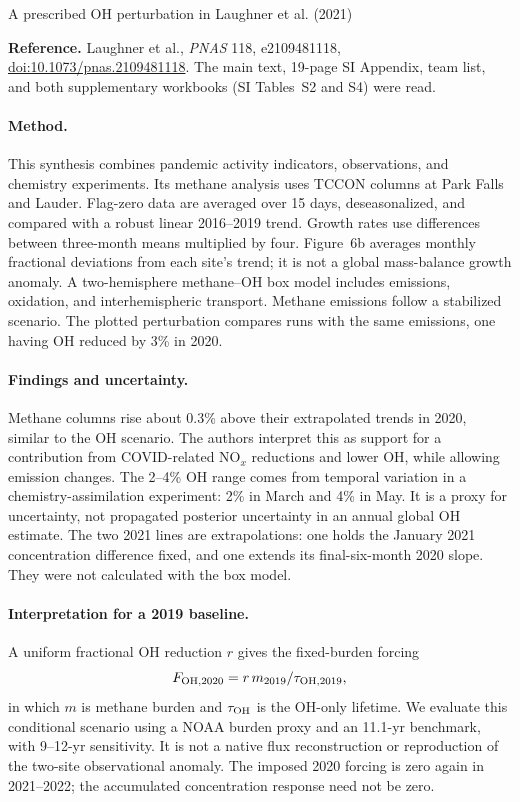 \documentclass[11pt]{article}
\begin{document}
\begin{center}\large A prescribed OH perturbation in Laughner et al. (2021)\end{center}
\noindent\textbf{Reference.} Laughner et al., \emph{PNAS} 118, e2109481118,
\href{https://doi.org/10.1073/pnas.2109481118}{doi:10.1073/pnas.2109481118}.
The main text, 19-page SI Appendix, team list, and both supplementary
workbooks (SI Tables~S2 and S4) were read.

\paragraph{Method.} This synthesis combines pandemic activity indicators,
observations, and chemistry experiments. Its methane analysis uses TCCON
columns at Park Falls and Lauder. Flag-zero data are averaged over 15 days,
deseasonalized, and compared with a robust linear 2016--2019 trend.
Growth rates use differences between three-month means multiplied by four.
Figure~6b averages monthly fractional deviations from each site's trend;
it is not a global mass-balance growth anomaly. A two-hemisphere methane--OH
box model includes emissions, oxidation, and interhemispheric transport.
Methane emissions follow a stabilized scenario. The plotted perturbation
compares runs with the same emissions, one having OH reduced by 3\% in 2020.

\paragraph{Findings and uncertainty.} Methane columns rise about 0.3\% above
their extrapolated trends in 2020, similar to the OH scenario. The authors
interpret this as support for a contribution from COVID-related NO$_x$
reductions and lower OH, while allowing emission changes. The 2--4\% OH
range comes from temporal variation in a chemistry-assimilation experiment:
2\% in March and 4\% in May. It is a proxy for uncertainty, not propagated
posterior uncertainty in an annual global OH estimate. The two 2021 lines
are extrapolations: one holds the January 2021 concentration difference
fixed, and one extends its final-six-month 2020 slope. They were not
calculated with the box model.

\paragraph{Interpretation for a 2019 baseline.} A uniform fractional
OH reduction $r$ gives the fixed-burden forcing
\begin{equation}
F_{{\rm OH},2020}=r\,m_{2019}/\tau_{{\rm OH},2019},
\end{equation}
in which $m$ is methane burden and $\tau_{\rm OH}$ is the OH-only lifetime.
We evaluate this conditional scenario using a NOAA burden proxy and an
11.1-yr benchmark, with 9--12-yr sensitivity. It is not a native flux
reconstruction or reproduction of the two-site observational anomaly.
The imposed 2020 forcing is zero again in 2021--2022; the accumulated
concentration response need not be zero.
\end{document}
